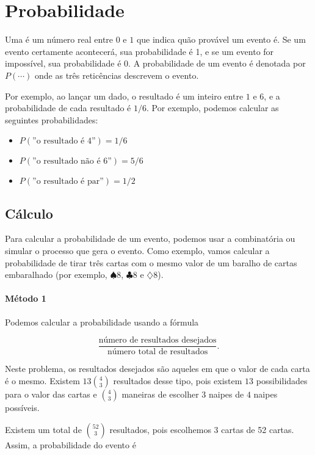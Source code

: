 \chapter{Probabilidade}

Uma  é um número real entre $0$ e $1$
que indica quão provável um evento é.
Se um evento certamente acontecerá,
sua probabilidade é 1,
e se um evento for impossível,
sua probabilidade é 0.
A probabilidade de um evento é denotada por $P(\cdots)$
onde as três reticências descrevem o evento.

Por exemplo, ao lançar um dado,
o resultado é um inteiro entre $1$ e $6$,
e a probabilidade de cada resultado é $1/6$.
Por exemplo, podemos calcular as seguintes probabilidades:

\begin{itemize}[noitemsep]
\item $P(\textrm{''o resultado é 4''})=1/6$
\item $P(\textrm{''o resultado não é 6''})=5/6$
\item $P(\textrm{''o resultado é par''})=1/2$
\end{itemize}

\section{Cálculo}

Para calcular a probabilidade de um evento,
podemos usar a combinatória
ou simular o processo que gera o evento.
Como exemplo, vamos calcular a probabilidade
de tirar três cartas com o mesmo valor
de um baralho de cartas embaralhado
(por exemplo, $\spadesuit 8$, $\clubsuit 8$ e $\diamondsuit 8$).

\subsubsection*{Método 1}

Podemos calcular a probabilidade usando a fórmula

\[\frac{\textrm{número de resultados desejados}}{\textrm{número total de resultados}}.\]

Neste problema, os resultados desejados são aqueles
em que o valor de cada carta é o mesmo.
Existem $13 {4 \choose 3}$ resultados desse tipo,
pois existem $13$ possibilidades para o
valor das cartas e ${4 \choose 3}$ maneiras de
escolher $3$ naipes de $4$ naipes possíveis.

Existem um total de ${52 \choose 3}$ resultados,
pois escolhemos 3 cartas de 52 cartas.
Assim, a probabilidade do evento é

